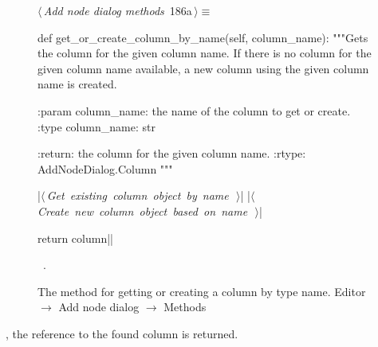 \documentclass[%
    a4paper,    %
    justified,  %
    nobib,      %
    openany     %
]{tufte-book}
\makeatletter
\renewcommand{\label}[1]{\@tufte@label{##1}}%
\makeatother
\begin{document}
\begin{figure}[!htbp]
\begin{flushleft} \small
\begin{minipage}{\linewidth}\label{scrap163}\raggedright\small
{} $\langle\,${\itshape Add node dialog methods}\nobreak\ {\footnotesize {186a}}$\,\rangle\equiv$
\vspace{-1ex}
\begin{pythoncode}
def get_or_create_column_by_name(self, column_name):
    """Gets the column for the given column name.
    If there is no column for the given column name available,
    a new column using the given column name is created.

    :param column_name: the name of the column to get or create.
    :type  column_name: str

    :return: the column for the given column name.
    :rtype:  AddNodeDialog.Column
    """

    |\hbox{$\langle\,${\itshape Get existing column object by name}\nobreak\ {\footnotesize {}}$\,\rangle$}|
    |\hbox{$\langle\,${\itshape Create new column object based on name}\nobreak\ {\footnotesize {}}$\,\rangle$}|

    return column|\NWsep|
\end{pythoncode}
\vspace{1.5ex}
\footnotesize
\begin{list}{}{\setlength{\itemsep}{-\parsep}\setlength{\itemindent}{-\leftmargin}}
\item \NWtxtMacroRefIn\ .

\item{}
\end{list}
\end{minipage}\vspace{4ex}
\end{flushleft}
\caption{The method for getting or creating a column by type name.
  \newline{}\newline{}Editor $\rightarrow$ Add node dialog $\rightarrow$ Methods}
\end{figure}

, the
reference to the found column is returned.
\end{document}
